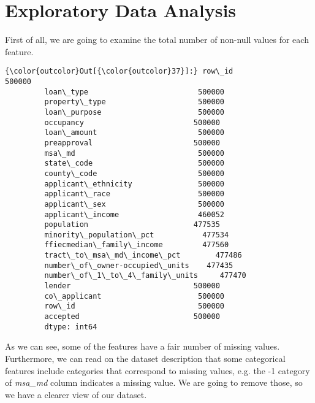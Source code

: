 \documentclass[11pt]{article}
\begin{document}
\pagebreak

    \section{Exploratory Data Analysis}\label{exploratory-data-analysis}

First of all, we are going to examine the total number of non-null
values for each feature.

\begin{Verbatim}[commandchars=\\\{\}]
{\color{outcolor}Out[{\color{outcolor}37}]:} row\_id                            500000
         loan\_type                         500000
         property\_type                     500000
         loan\_purpose                      500000
         occupancy                         500000
         loan\_amount                       500000
         preapproval                       500000
         msa\_md                            500000
         state\_code                        500000
         county\_code                       500000
         applicant\_ethnicity               500000
         applicant\_race                    500000
         applicant\_sex                     500000
         applicant\_income                  460052
         population                        477535
         minority\_population\_pct           477534
         ffiecmedian\_family\_income         477560
         tract\_to\_msa\_md\_income\_pct        477486
         number\_of\_owner-occupied\_units    477435
         number\_of\_1\_to\_4\_family\_units     477470
         lender                            500000
         co\_applicant                      500000
         row\_id                            500000
         accepted                          500000
         dtype: int64
\end{Verbatim}
            
    As we can see, some of the features have a fair number of missing
values. Furthermore, we can read on the dataset description that some
categorical features include categories that correspond to missing
values, e.g. the -1 category of \emph{msa\_md} column indicates a
missing value. We are going to remove those, so we have a clearer view
of our dataset. 

\pagebreak
\end{document}
